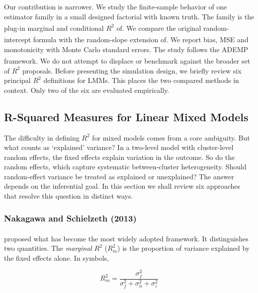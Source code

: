 \documentclass[
  11pt,
]{article}
\begin{document}
Our contribution is narrower. We study the finite-sample behavior
of one estimator family in a small designed factorial with known
truth. The family is the plug-in marginal and conditional \(R^2\) of\textsuperscript{}. We compare the original
random-intercept formula with the random-slope extension of\textsuperscript{}. We report bias, MSE and
monotonicity with Monte Carlo standard errors. The study follows
the ADEMP framework\textsuperscript{}. We do not
attempt to displace or benchmark against the broader set of \(R^2\)
proposals. Before
presenting the simulation design, we briefly review six principal
\(R^2\) definitions for LMMs. This places the two compared methods
in context. Only two of the six are evaluated empirically.

\subsection{R-Squared Measures for Linear Mixed Models}\label{r-squared-measures-for-linear-mixed-models}

The difficulty in defining \(R^2\) for mixed models comes from a
core ambiguity. But what counts as `explained' variance? In a
two-level model with cluster-level random effects, the fixed
effects explain variation in the outcome. So do the random
effects, which capture systematic between-cluster heterogeneity.
Should random-effect variance be treated as explained or
unexplained? The answer depends on the inferential goal. In this
section we shall review six approaches that resolve this question
in distinct ways.

\subsubsection{Nakagawa and Schielzeth (2013)}\label{nakagawa-and-schielzeth-2013}

\textsuperscript{} proposed what has become the
most widely adopted framework. It distinguishes two quantities.
The \emph{marginal} \(R^2\) (\(R^2_m\)) is the proportion of variance
explained by the fixed effects alone. In symbols,

\begin{equation}
R^2_m = \frac{\sigma^2_f}{\sigma^2_f + \sigma^2_\alpha +
  \sigma^2_\varepsilon}
\label{eq:ns-r2m}
\end{equation}
\end{document}
